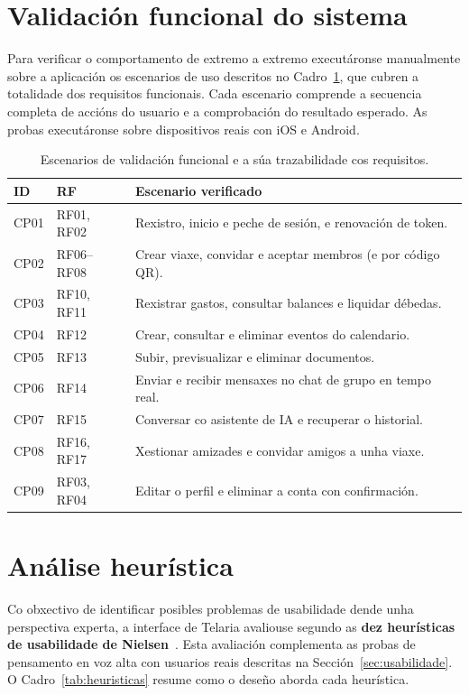 \section{Validación funcional do sistema}

Para verificar o comportamento de extremo a extremo executáronse manualmente sobre a
aplicación os escenarios de uso descritos no Cadro~\ref{tab:escenarios}, que cubren a
totalidade dos requisitos funcionais. Cada escenario comprende a secuencia completa de
accións do usuario e a comprobación do resultado esperado. As probas executáronse sobre
dispositivos reais con iOS e Android.

\begin{table}[H]
  \caption{Escenarios de validación funcional e a súa trazabilidade cos requisitos.}
  \label{tab:escenarios}
  \centering
  \begin{tabularx}{\textwidth}{@{}llX@{}}
    \toprule
    \textbf{ID} & \textbf{RF} & \textbf{Escenario verificado} \\
    \midrule
    CP01 & RF01, RF02      & Rexistro, inicio e peche de sesión, e renovación de token. \\
    CP02 & RF06--RF08      & Crear viaxe, convidar e aceptar membros (e por código QR). \\
    CP03 & RF10, RF11      & Rexistrar gastos, consultar balances e liquidar débedas. \\
    CP04 & RF12            & Crear, consultar e eliminar eventos do calendario. \\
    CP05 & RF13            & Subir, previsualizar e eliminar documentos. \\
    CP06 & RF14            & Enviar e recibir mensaxes no chat de grupo en tempo real. \\
    CP07 & RF15            & Conversar co asistente de IA e recuperar o historial. \\
    CP08 & RF16, RF17      & Xestionar amizades e convidar amigos a unha viaxe. \\
    CP09 & RF03, RF04      & Editar o perfil e eliminar a conta con confirmación. \\
    \bottomrule
  \end{tabularx}
\end{table}

\section{Análise heurística}

Co obxectivo de identificar posibles problemas de usabilidade dende unha perspectiva
experta, a interface de Telaria avaliouse segundo as \textbf{dez heurísticas de
usabilidade de Nielsen}~\cite{nielsen1994usability}. Esta avaliación complementa as
probas de pensamento en voz alta con usuarios reais descritas na
Sección~\ref{sec:usabilidade}. O Cadro~\ref{tab:heuristicas} resume como o deseño aborda
cada heurística.

